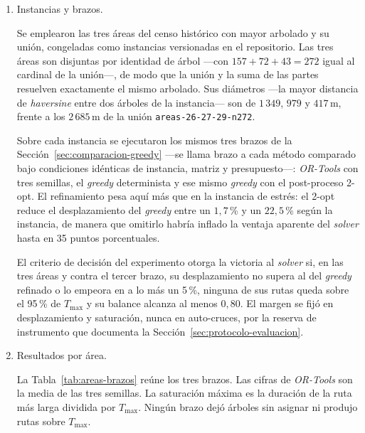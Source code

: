 \begin{enumerate}
\item Instancias y brazos.

Se emplearon las tres áreas del censo histórico con mayor arbolado y su unión, congeladas como
instancias versionadas en el repositorio. Las tres áreas son disjuntas por identidad de árbol
---con $157 + 72 + 43 = 272$ igual al cardinal de la unión---, de modo que la unión y la suma de
las partes resuelven exactamente el mismo arbolado. Sus diámetros ---la mayor distancia de
\textit{haversine} entre dos árboles de la instancia--- son de $1\,349$, $979$ y $417$\,m, frente a
los $2\,685$\,m de la unión \texttt{areas-26-27-29-n272}.

Sobre cada instancia se ejecutaron los mismos tres brazos de la
Sección~\ref{sec:comparacion-greedy} ---se llama brazo a cada método comparado bajo condiciones
idénticas de instancia, matriz y presupuesto---: \textit{OR-Tools} con tres semillas, el
\textit{greedy} determinista y ese mismo \textit{greedy} con el post-proceso 2-opt. El refinamiento
pesa aquí más que en la instancia de estrés: el 2-opt reduce el desplazamiento del \textit{greedy}
entre un $1{,}7$\,\% y un $22{,}5$\,\% según la instancia, de manera que omitirlo habría inflado la
ventaja aparente del \textit{solver} hasta en 35 puntos porcentuales.

El criterio de decisión del experimento otorga la victoria al \textit{solver} si, en las tres áreas
y contra el tercer brazo, su desplazamiento no supera al del \textit{greedy}
refinado o lo empeora en a lo más un 5\,\%, ninguna de sus rutas queda sobre el 95\,\% de $T_{\max}$
y su balance alcanza al menos $0{,}80$. El margen se fijó en desplazamiento y saturación, nunca en
auto-cruces, por la reserva de instrumento que documenta la Sección~\ref{sec:protocolo-evaluacion}.

\item Resultados por área.

La Tabla~\ref{tab:areas-brazos} reúne los tres brazos. Las cifras de \textit{OR-Tools} son la media
de las tres semillas. La saturación máxima es la duración de la ruta más larga dividida por
$T_{\max}$. Ningún brazo dejó árboles sin asignar ni produjo rutas sobre $T_{\max}$.


\end{enumerate}
